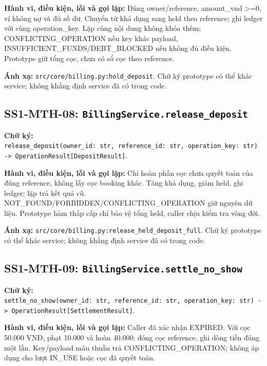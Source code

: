 \documentclass[11pt,a4paper]{article}
\begin{document}
\textbf{Hành vi, điều kiện, lỗi và gọi lặp:} Đúng owner/reference,
amount\_vnd \textgreater=0, ví không nợ và đủ số dư. Chuyển từ khả dụng
sang held theo reference; ghi ledger với cùng operation\_key. Lặp cùng
nội dung không khóa thêm; CONFLICTING\_OPERATION nếu key khác payload,
INSUFFICIENT\_FUNDS/DEBT\_BLOCKED nếu không đủ điều kiện. Prototype giữ
tổng cọc, chưa có sổ cọc theo reference.

\textbf{Ánh xạ:} \texttt{src/core/billing.py:hold\_deposit}. Chữ ký
prototype có thể khác service; không khẳng định service đã có trong
code.

\hypertarget{ss1-mth-08-billingservice.release_deposit}{%
\subsection{\texorpdfstring{SS1-MTH-08:
\texttt{BillingService.release\_deposit}}{SS1-MTH-08: BillingService.release\_deposit}}\label{ss1-mth-08-billingservice.release_deposit}}

\textbf{Chữ ký:}
\texttt{release\_deposit(owner\_id:\ str,\ reference\_id:\ str,\ operation\_key:\ str)\ -\textgreater{}\ OperationResult{[}DepositResult{]}}.

\textbf{Hành vi, điều kiện, lỗi và gọi lặp:} Chỉ hoàn phần cọc chưa
quyết toán của đúng reference, không lấy cọc booking khác. Tăng khả
dụng, giảm held, ghi ledger; lặp trả kết quả cũ.
NOT\_FOUND/FORBIDDEN/CONFLICTING\_OPERATION giữ nguyên dữ liệu.
Prototype hàm thấp cấp chỉ bảo vệ tổng held, caller chịu kiểm tra vòng
đời.

\textbf{Ánh xạ:}
\texttt{src/core/billing.py:release\_held\_deposit\_full}. Chữ ký
prototype có thể khác service; không khẳng định service đã có trong
code.

\hypertarget{ss1-mth-09-billingservice.settle_no_show}{%
\subsection{\texorpdfstring{SS1-MTH-09:
\texttt{BillingService.settle\_no\_show}}{SS1-MTH-09: BillingService.settle\_no\_show}}\label{ss1-mth-09-billingservice.settle_no_show}}

\textbf{Chữ ký:}
\texttt{settle\_no\_show(owner\_id:\ str,\ reference\_id:\ str,\ operation\_key:\ str)\ -\textgreater{}\ OperationResult{[}SettlementResult{]}}.

\textbf{Hành vi, điều kiện, lỗi và gọi lặp:} Caller đã xác nhận EXPIRED.
Với cọc 50.000 VNĐ, phạt 10.000 và hoàn 40.000; đóng cọc reference, ghi
dòng tiền đúng một lần. Key/payload mâu thuẫn trả
CONFLICTING\_OPERATION; không áp dụng cho lượt IN\_USE hoặc cọc đã quyết
toán.
\end{document}
